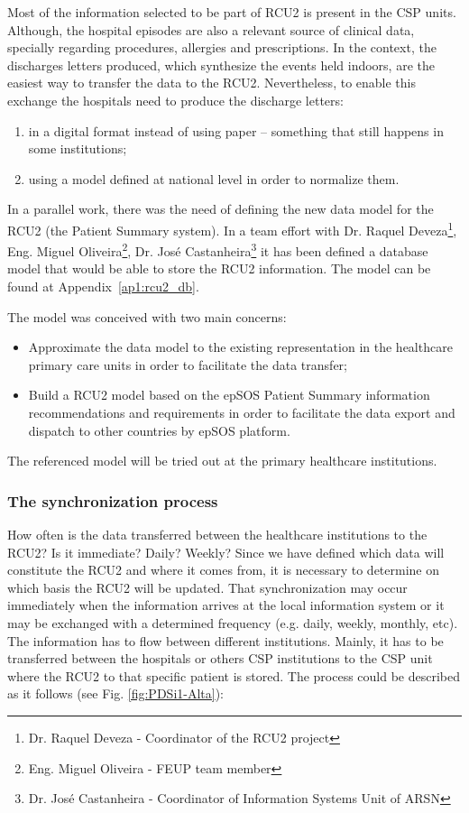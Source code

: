 Most of the information selected to be part of RCU2 is present in the CSP units. Although, the hospital episodes are also a relevant source of clinical data, specially regarding procedures, allergies and prescriptions. In the context, the discharges letters produced, which synthesize the events held indoors, are the easiest way to transfer the data to the RCU2. Nevertheless, to enable this exchange the hospitals need to produce the discharge letters:
\begin{enumerate}
\item in a digital format instead of using paper -- something that still happens in some institutions;
\item using a model defined at national level in order to normalize them.
\end{enumerate}


In a parallel work, there was the need of defining the new data model for the RCU2 (the Patient Summary system). In a team effort with Dr. Raquel Deveza\footnote{Dr. Raquel Deveza - Coordinator of the RCU2 project}, Eng. Miguel Oliveira\footnote{Eng. Miguel Oliveira - FEUP team member}, Dr. José Castanheira\footnote{Dr. José Castanheira - Coordinator of Information Systems Unit of ARSN} it has been defined a database model that would be able to store the RCU2 information. The model can be found at Appendix~\ref{ap1:rcu2_db}.

The model was conceived with two main concerns:
\begin{itemize}
\item Approximate the data model to the existing representation in the healthcare primary care units in order to facilitate the data transfer;
\item Build a RCU2 model based on the epSOS Patient Summary information recommendations and requirements in order to facilitate the data export and dispatch to other countries by epSOS platform.
\end{itemize}

The referenced model will be tried out at the primary healthcare institutions.


\subsubsection{The synchronization process}

How often is the data transferred between the healthcare institutions to the RCU2? Is it immediate? Daily? Weekly? Since we have defined which data will constitute the RCU2 and where it comes from, it is necessary to determine on which basis the RCU2 will be updated. That synchronization may occur immediately when the information arrives at the local information system or it may be exchanged with a determined frequency (e.g. daily, weekly, monthly, etc).
The information has to flow between different institutions. Mainly, it has to be transferred between the hospitals or others CSP institutions to the CSP unit where the RCU2 to that specific patient is stored. The process could be described as it follows (see Fig. \ref{fig:PDSi1-Alta}):

